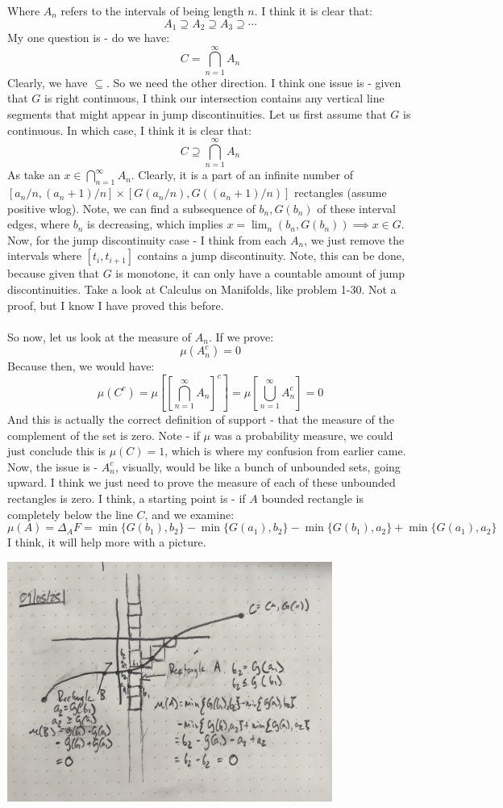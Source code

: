 \documentclass[12pt,a4paper]{article}
\newcommand{\1}[1]{\mathbbm{1}\left\{ #1 \right\}}
\begin{document}
Where $A_n$ refers to the intervals of being length $n$. I think it is clear that:
$$
	A_1 \supseteq A_2 \supseteq A_3 \supseteq \cdots
$$
My one question is - do we have:
$$
	C = \bigcap_{n=1}^\infty A_n
$$
Clearly, we have $\subseteq$. So we need the other direction. I think one issue is - given that $G$ is right continuous, I think our intersection contains any vertical line segments that might appear in jump discontinuities. Let us first assume that $G$ is continuous. In which case, I think it is clear that:
$$
	C \supseteq \bigcap_{n=1}^\infty A_n
$$
As take an $x \in \bigcap_{n=1}^\infty A_n$. Clearly, it is a part of an infinite number of $[a_n/n,(a_n+1)/n] \times  [G(a_n/n), G((a_n+1)/n)]$ rectangles (assume positive wlog). Note, we can find a subsequence of $b_n, G(b_n)$ of these interval edges, where $b_n$ is decreasing, which implies $x = \lim_n (b_n,G(b_n)) \implies x \in G$. Now, for the jump discontinuity case - I think from each $A_n$, we just remove the intervals where $[t_i,t_{i+1}]$ contains a jump discontinuity. Note, this can be done, because given that $G$ is monotone, it can only have a countable amount of jump discontinuities. Take a look at Calculus on Manifolds, like problem 1-30. Not a proof, but I know I have proved this before.
\\\\
So now, let us look at the measure of $A_n$. If we prove:
$$
	\mu(A_n^c) = 0
$$
Because then, we would have:
$$
	\mu(C^c) = \mu\left[\left[\bigcap_{n=1}^\infty A_n\right]^c\right] =
	\mu\left[\bigcup_{n=1}^\infty A_n^c\right] = 0
$$
And this is actually the correct definition of support - that the measure of the complement of the set is zero. Note - if $\mu$ was a probability measure, we could just conclude this is $\mu(C) = 1$, which is where my confusion from earlier came. Now, the issue is - $A_n^c$, visually, would be like a bunch of unbounded sets, going upward. I think we just need to prove the measure of each of these unbounded rectangles is zero. I think, a starting point is - if $A$ bounded rectangle is completely below the line $C$, and we examine:
$$
	\mu(A) = \Delta_AF =
	\min\{G(b_1),b_2\} - \min\{G(a_1),b_2\} - \min\{G(b_1),a_2\} + \min\{G(a_1),a_2\}
$$
I think, it will help more with a picture.
\begin{center}
	\includegraphics[width=0.8\textwidth]{problem_12_11_1.jpg}
\end{center}
\end{document}
